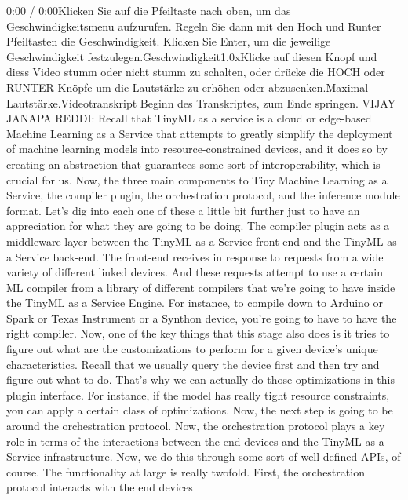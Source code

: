 {{{{{    0:00 / 0:00Klicken Sie auf die Pfeiltaste nach oben, um das Geschwindigkeitsmenu aufzurufen. Regeln Sie dann mit den Hoch und Runter Pfeiltasten die Geschwindigkeit. Klicken Sie Enter, um die jeweilige Geschwindigkeit festzulegen.Geschwindigkeit1.0xKlicke auf diesen Knopf und diess Video stumm oder nicht stumm zu schalten, oder drücke die HOCH oder RUNTER Knöpfe um die Lautstärke zu erhöhen oder abzusenken.Maximal Lautstärke.Videotranskript
    Beginn des Transkriptes, zum Ende springen.
    VIJAY JANAPA REDDI: Recall that TinyML as a service
    is a cloud or edge-based Machine Learning as a Service
    that attempts to greatly simplify the deployment of machine learning models
    into resource-constrained devices, and it does so
    by creating an abstraction that guarantees
    some sort of interoperability, which is crucial for us.
    Now, the three main components to Tiny Machine Learning
    as a Service, the compiler plugin, the orchestration protocol,
    and the inference module format.
    Let's dig into each one of these a little bit
    further just to have an appreciation for what they are going to be doing.
    The compiler plugin acts as a middleware layer
    between the TinyML as a Service front-end
    and the TinyML as a Service back-end.
    The front-end receives in response to requests from a wide variety
    of different linked devices.
    And these requests attempt to use a certain ML compiler
    from a library of different compilers that we're
    going to have inside the TinyML as a Service Engine.
    For instance, to compile down to Arduino or Spark
    or Texas Instrument or a Synthon device, you're
    going to have to have the right compiler.
    Now, one of the key things that this stage also does
    is it tries to figure out what are the customizations to perform for a given
    device's unique characteristics.
    Recall that we usually query the device first and then try and figure out
    what to do.
    That's why we can actually do those optimizations in this plugin interface.
    For instance, if the model has really tight resource constraints,
    you can apply a certain class of optimizations.
    Now, the next step is going to be around the orchestration protocol.
    Now, the orchestration protocol plays a key role
    in terms of the interactions between the end devices
    and the TinyML as a Service infrastructure.
    Now, we do this through some sort of well-defined APIs, of course.
    The functionality at large is really twofold.
    First, the orchestration protocol interacts with the end devices
}}}}}
